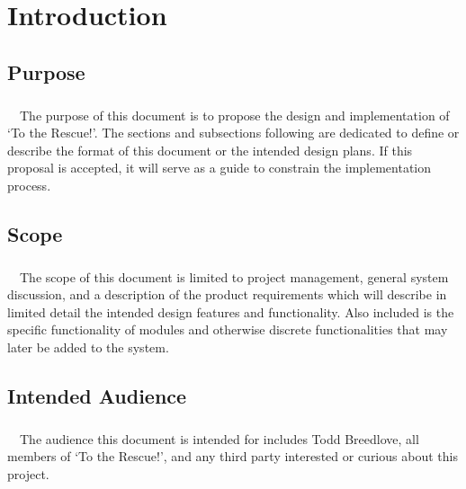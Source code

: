 \documentclass[12pt]{report}
\begin{document}
\tableofcontents
	\thispagestyle{fancy}
\newpage

\pagestyle{fancy}

\chapter{Introduction}
	\label{ch:intro}
	\thispagestyle{fancy}
	
	\section{Purpose}
	\label{sec:Purpose}
	\paragraph{}\ \ The purpose of this document is to propose the design and implementation of ‘To the Rescue!’. The sections and subsections following are dedicated to define or describe the format of this document or the intended design plans. If this proposal is accepted, it will serve as a guide to constrain the implementation process.  
	
	\section{Scope}
	\label{sec:Scope}
	\paragraph{}\ \ The scope of this document is limited to project management, general system discussion, and a description of the product requirements which will describe in limited detail the intended design features and functionality. Also included is the specific functionality of modules and otherwise discrete functionalities that may later be added to the system.
	\section{Intended Audience}
	\label{sec:IntendedAudience}
	\paragraph{}\ \ The audience this document is intended for includes Todd Breedlove, all members of ‘To the Rescue!’, and any third party interested or curious about this project.
	
\end{document}
